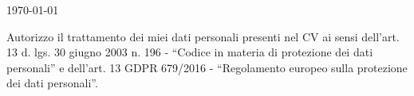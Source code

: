 \documentclass[11pt, a4paper]{russell}
\begin{document}
\makecvheader

\makecvfooter
  {\today}
  {}
  {\thepage}


\vspace{-3mm}

% 
\vspace{-2mm}

\vspace{-4mm}

\vspace{-4mm}

\vspace{-4mm}


\vspace*{\fill}
\footnotesize{Autorizzo il trattamento dei miei dati personali presenti nel CV ai sensi dell’art. 13 d. lgs. 30 giugno 2003 n. 196 - “Codice in materia di protezione dei dati personali” e dell’art. 13 GDPR 679/2016 - “Regolamento europeo sulla protezione dei dati personali”. }
\end{document}
